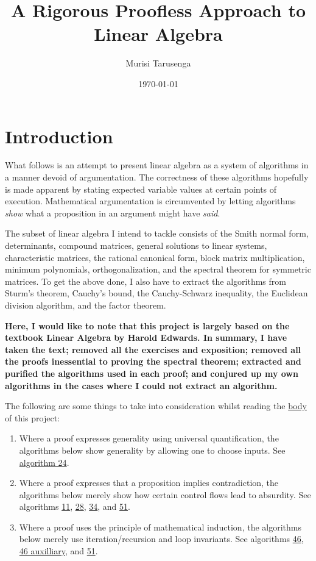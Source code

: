 \documentclass[twocolumn]{article}
\begin{document}
	\title{A Rigorous Proofless Approach to Linear Algebra}
	\author{Murisi Tarusenga}
	\date{\today{} \currenttime}
	\maketitle
	\section{Introduction}
		What follows is an attempt to present linear algebra as a system of algorithms in a manner devoid of argumentation. The correctness of these algorithms hopefully is made apparent by stating expected variable values at certain points of execution. Mathematical argumentation is circumvented by letting algorithms \textit{show} what a proposition in an argument might have \textit{said}.
		
		The subset of linear algebra I intend to tackle consists of the Smith normal form, determinants, compound matrices, general solutions to linear systems, characteristic matrices, the rational canonical form, block matrix multiplication, minimum polynomials, orthogonalization, and the spectral theorem for symmetric matrices. To get the above done, I also have to extract the algorithms from Sturm's theorem, Cauchy's bound, the Cauchy-Schwarz inequality, the Euclidean division algorithm, and the factor theorem.
		
		\textbf{Here, I would like to note that this project is largely based on the textbook Linear Algebra by Harold Edwards. In summary, I have taken the text; removed all the exercises and exposition; removed all the proofs inessential to proving the spectral theorem; extracted and purified the algorithms used in each proof; and conjured up my own algorithms in the cases where I could not extract an algorithm.}
		
		The following are some things to take into consideration whilst reading the \hyperref[sec:body]{body} of this project:
		\begin{enumerate}
			\item Where a proof expresses generality using universal quantification, the algorithms below show generality by allowing one to choose inputs. See \hyperref[sec:algorithm 24]{algorithm 24}.
			\item Where a proof expresses that a proposition implies contradiction, the algorithms below merely show how certain control flows lead to absurdity. See algorithms \hyperref[sec:algorithm 11]{11}, \hyperref[sec:algorithm 28]{28}, \hyperref[sec:algorithm 35]{34}, and \hyperref[sec:algorithm 52]{51}.
			\item Where a proof uses the principle of mathematical induction, the algorithms below merely use iteration/recursion and loop invariants. See algorithms \hyperref[sec:algorithm 47]{46}, \hyperref[sec:algorithm 47]{46 auxilliary}, and \hyperref[sec:algorithm 52]{51}.
		\end{enumerate}
		
\end{document}
